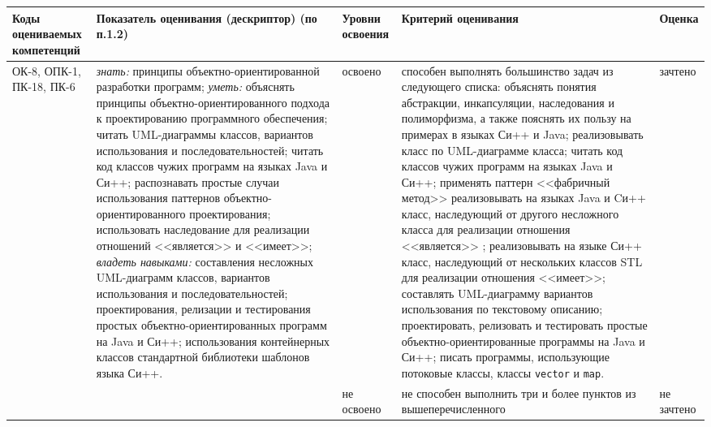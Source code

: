 \documentclass[a4paper,12pt]{article}
\begin{document}
\begin{longtable}{|p{15mm}|p{53mm}|p{16mm}|p{43mm}|p{14mm}|}
\hline
  \centering\small Коды оцениваемых компетенций
& \centering Показатель оценивания (дескриптор) (по п.1.2) 
& \centering\small Уровни освоения 
& \centering Критерий оценивания 
& \centering\small\arraybackslash Оценка
\\
\hline

\multirow{2}{15mm}{ОК-8, ОПК-1, ПК-18, ПК-6}
&
\multirow{2}{53mm}{\parbox{53mm}{%
\vrule width 0pt height 10pt \emph{знать:}\newline
принципы объектно-ориентированной разработки программ; \newline
\emph{уметь:}\newline
объяснять принципы объектно-ориентированного подхода к проектированию программного обеспечения; читать UML-диаграммы классов, вариантов использования и последовательностей; читать код классов чужих программ на языках Java и Си++; распознавать простые случаи использования паттернов объектно-ориентированного проектирования; использовать наследование для реализации отношений <<является>> и <<имеет>>; \newline
\emph{владеть навыками:}\newline
составления несложных UML-диаграмм классов, вариантов использования и последовательностей; проектирования, релизации и тестирования простых объектно-ориентированных программ на Java и Си++; использования контейнерных классов стандартной библиотеки шаблонов языка Си++. 
}}
& 
освоено & способен выполнять большинство задач из следующего списка:
объяснять понятия абстракции, инкапсуляции, наследования и полиморфизма, а также
пояснять их пользу на примерах в языках Си++ и Java;
реализовывать класс по UML-диаграмме класса;
читать код классов чужих программ на языках Java и Си++;
применять паттерн <<фабричный метод>>
реализовывать на языках Java и Cи++ класс, наследующий от другого несложного класса для реализации отношения <<является>> ;
реализовывать на языке Си++ класс, наследующий от нескольких классов STL для реализации отношения <<имеет>>;
составлять UML-диаграмму вариантов использования по текстовому описанию;
проектировать, релизовать и тестировать простые объектно-ориентированные программы на Java и Си++;
писать программы, использующие потоковые классы, классы {\tt vector} и {\tt map}. & зачтено 
\\ 

\cline{3-5}
& & не освоено & не способен выполнить три и более пунктов из вышеперечисленного\linebreak~\linebreak & не зачтено 
\\

\hline

\end{longtable}
\end{document}
